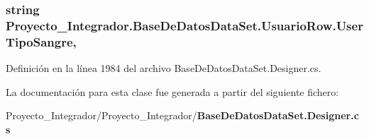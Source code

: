 \subsubsection[{User\-Tipo\-Sangre}]{\setlength{\rightskip}{0pt plus 5cm}string Proyecto\-\_\-\-Integrador.\-Base\-De\-Datos\-Data\-Set.\-Usuario\-Row.\-User\-Tipo\-Sangre\hspace{0.3cm}{\ttfamily [get]}, {\ttfamily [set]}}\label{class_proyecto___integrador_1_1_base_de_datos_data_set_1_1_usuario_row_ac0fdc914670920bd560368e8625a1bd1}


Definición en la línea 1984 del archivo Base\-De\-Datos\-Data\-Set.\-Designer.\-cs.



La documentación para esta clase fue generada a partir del siguiente fichero\-:\begin{DoxyCompactItemize}
\item 
Proyecto\-\_\-\-Integrador/\-Proyecto\-\_\-\-Integrador/{\bf Base\-De\-Datos\-Data\-Set.\-Designer.\-cs}\end{DoxyCompactItemize}
